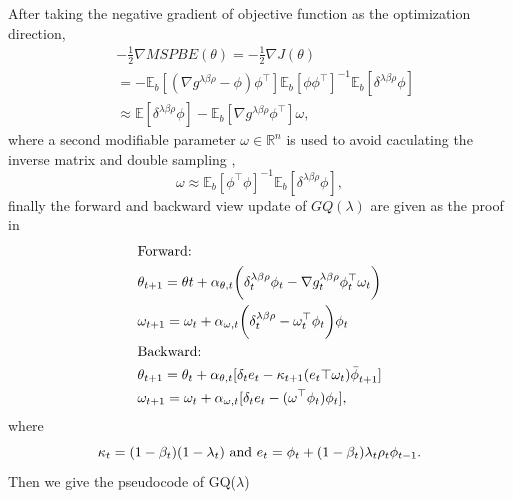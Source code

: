 \documentclass[conference]{IEEEtran}
\begin{document}
After taking the negative gradient of objective function as the optimization direction,
\begin{equation}
\begin{split}
  &-\frac{1}{2}\nabla MSPBE(\theta) =-\frac{1}{2}\nabla J(\theta) \\
  &= -\mathbb{E}_b[(\nabla g^{\lambda \beta\rho} - \phi) \phi^\top ]\mathbb{E}_b[\phi\phi^\top ]^{-1}\mathbb{E}_b[\delta^{\lambda\beta\rho}\phi]\\
  &\approx \mathbb{E}[\delta^{\lambda\beta\rho}\phi]-\mathbb{E}_b[\nabla g^{\lambda \beta\rho}\phi^\top ]\omega,
  \end{split}
\end{equation}
where a second modifiable parameter $\omega\in\mathbb{R}^n$ is used to avoid caculating the inverse matrix and double sampling   \cite{sutton1998reinforcement},
\begin{equation}
  \omega\approx \mathbb{E}_b[\phi^\top \phi]^{-1}\mathbb{E}_b[\delta^{\lambda\beta\rho}\phi],
\end{equation}
finally the forward and backward view update of $GQ(\lambda)$ are given as the proof in \cite{maei2010gq}
\begin{equation}
\begin{split}
  &\textup{Forward:}\\
  &\theta_{t+1}=\theta{t}+\alpha_{\theta, t}\bigg(\delta^{\lambda\beta\rho}_t\phi_t-\nabla g^{\lambda\beta\rho}_t\phi_t^\top\omega_t\bigg)\\
  &\omega_{t+1}=\omega_t+\alpha_{\omega, t}\bigg(\delta^{\lambda\beta\rho}_t-\omega_t^\top\phi_t\bigg)\phi_t\\
  &\textup{Backward:}\\
  &\theta_{t+1}=\theta_t+\alpha_{\theta, t}[\delta_te_t-\kappa_{t+1}({e_t}\top \omega_{t}){\bar{\phi}}_{t+1}]\\
  &\omega_{t+1}=\omega_{t}+\alpha_{\omega, t}[\delta_te_t-(\omega^\top\phi_t)\phi_t],
\end{split}
\end{equation}
where
\begin{equation}
\kappa_t=(1-\beta_t)(1-\lambda_t) \ \textup{and} \ e_t=\phi_t+(1-\beta_t)\lambda_t\rho_t\phi_{t-1}.
\end{equation}
Then we give the pseudocode of GQ($\lambda$)\\
\end{document}
